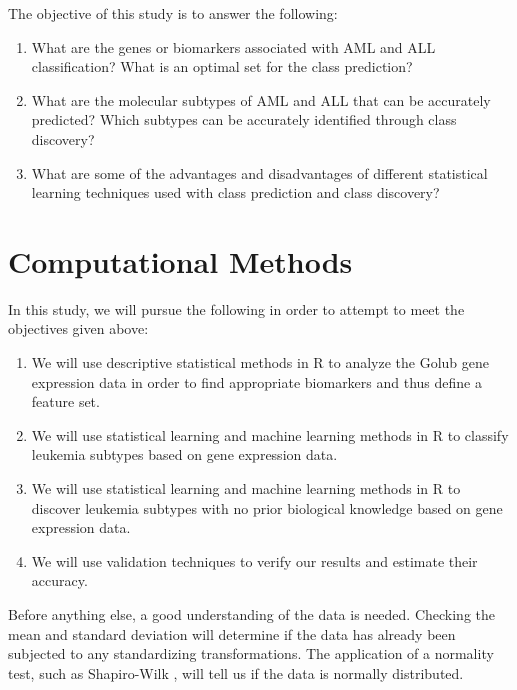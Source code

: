\documentclass{article}
\begin{document}
The objective of this study is to answer the following:

\begin{enumerate}

  \item What are the genes or biomarkers associated with AML and ALL
    classification? What is an optimal set for the class prediction?

  \item What are the molecular subtypes of AML and ALL that can be
    accurately predicted? Which subtypes can be accurately identified
    through class discovery?

  \item What are some of the advantages and disadvantages of different
    statistical learning techniques used with class prediction and
    class discovery?

\end{enumerate}


\section{Computational Methods}

In this study, we will pursue the following in order to attempt to
meet the objectives given above:

\begin{enumerate}

  \item We will use descriptive statistical methods in R to analyze
    the Golub gene expression data in order to find appropriate
    biomarkers and thus define a feature set.

  \item We will use statistical learning and machine learning methods
    in R to classify leukemia subtypes based on gene expression data.

  \item We will use statistical learning and machine learning methods
    in R to discover leukemia subtypes with no prior biological
    knowledge based on gene expression data.

  \item We will use validation techniques to verify our results and
    estimate their accuracy.

\end{enumerate}

Before anything else, a good understanding of the data is
needed. Checking the mean and standard deviation will determine if the
data has already been subjected to any standardizing
transformations. The application of a normality test, such as
Shapiro-Wilk \autocite{razali2011power}, will tell us if the data is
normally distributed.
\end{document}
